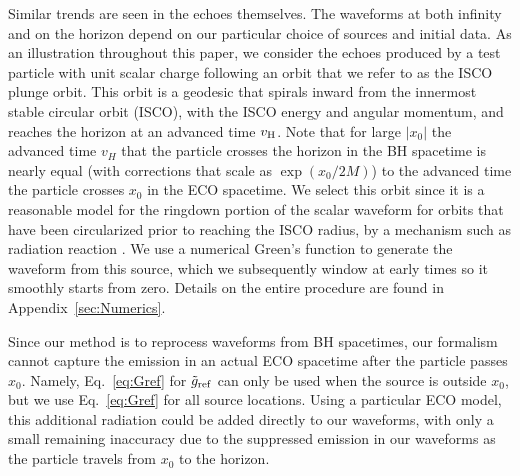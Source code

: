 \begin{refsection}
Similar trends are seen in the echoes themselves.
The waveforms at both infinity and on the horizon depend on our particular choice of sources and initial data.
As an illustration throughout this paper, we consider the echoes produced by a test particle with unit scalar charge following an orbit that we refer to as the ISCO plunge orbit. 
This orbit is a geodesic that spirals inward from the innermost stable circular orbit (ISCO), with the ISCO energy and angular momentum, and reaches the horizon at an advanced time $v_{\rm H}$. Note that for large $|x_0|$ the advanced time $v_H$ that the particle crosses the horizon in the BH spacetime is nearly equal (with corrections that scale as $\exp(x_0/2M)$) to the advanced time the particle crosses $x_0$ in the ECO spacetime.
We select this orbit since it is a reasonable model for the ringdown portion of the scalar waveform for orbits that have been circularized prior to reaching the ISCO radius, by a mechanism such as radiation reaction \cite{Hadar:2009ip}.
We use a numerical Green's function to generate the waveform from this source, which we subsequently window at early times so it smoothly starts from zero. 
Details on the entire procedure are found in Appendix~\ref{sec:Numerics}.


Since our method is to reprocess waveforms from BH spacetimes, our formalism cannot capture the emission in an actual ECO spacetime after the particle passes $x_0$.
Namely, Eq.~\eqref{eq:Gref} for $\tilde g_{\rm ref}$ can only be used when the source is outside $x_0$, but we use Eq.~\eqref{eq:Gref} for all source locations.
Using a particular ECO model, this additional radiation could be added directly to our waveforms, with only a small remaining inaccuracy due to the suppressed emission in our waveforms as the particle travels from $x_0$ to the horizon. 


\end{refsection}
